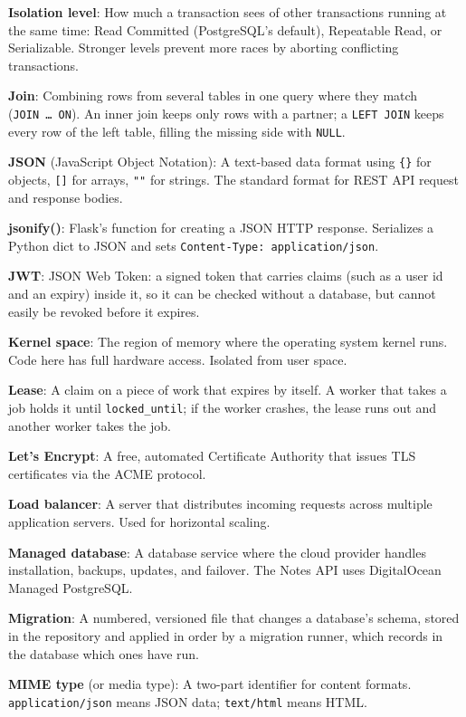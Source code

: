 \textbf{Isolation level}: How much a transaction sees of other transactions running at the same time: Read Committed (PostgreSQL's default), Repeatable Read, or Serializable. Stronger levels prevent more races by aborting conflicting transactions.

\textbf{Join}: Combining rows from several tables in one query where they match (\texttt{JOIN\ …\ ON}). An inner join keeps only rows with a partner; a \texttt{LEFT\ JOIN} keeps every row of the left table, filling the missing side with \texttt{NULL}.

\textbf{JSON} (JavaScript Object Notation): A text-based data format using \texttt{\{\}} for objects, \texttt{{[}{]}} for arrays, \texttt{""} for strings. The standard format for REST API request and response bodies.

\textbf{jsonify()}: Flask's function for creating a JSON HTTP response. Serializes a Python dict to JSON and sets \texttt{Content-}\allowbreak{}\texttt{Type:}\allowbreak{}\texttt{\ application/}\allowbreak{}\texttt{json}.

\textbf{JWT}: JSON Web Token: a signed token that carries claims (such as a user id and an expiry) inside it, so it can be checked without a database, but cannot easily be revoked before it expires.

\textbf{Kernel space}: The region of memory where the operating system kernel runs. Code here has full hardware access. Isolated from user space.

\textbf{Lease}: A claim on a piece of work that expires by itself. A worker that takes a job holds it until \texttt{locked\_until}; if the worker crashes, the lease runs out and another worker takes the job.

\textbf{Let's Encrypt}: A free, automated Certificate Authority that issues TLS certificates via the ACME protocol.

\textbf{Load balancer}: A server that distributes incoming requests across multiple application servers. Used for horizontal scaling.

\textbf{Managed database}: A database service where the cloud provider handles installation, backups, updates, and failover. The Notes API uses DigitalOcean Managed PostgreSQL.

\textbf{Migration}: A numbered, versioned file that changes a database's schema, stored in the repository and applied in order by a migration runner, which records in the database which ones have run.

\textbf{MIME type} (or media type): A two-part identifier for content formats. \texttt{application/json} means JSON data; \texttt{text/html} means HTML.

